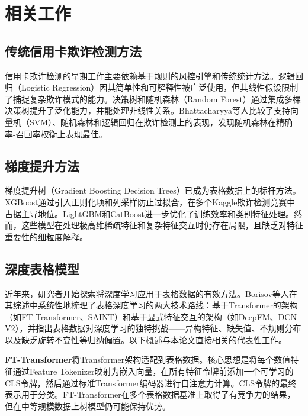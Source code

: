
\section{相关工作}

\subsection{传统信用卡欺诈检测方法}

信用卡欺诈检测的早期工作主要依赖基于规则的风控引擎和传统统计方法。逻辑回归（Logistic Regression）因其简单性和可解释性被广泛使用，但其线性假设限制了捕捉复杂欺诈模式的能力。决策树和随机森林（Random Forest）通过集成多棵决策树提升了泛化能力，并能处理非线性关系。Bhattacharyya等人\cite{bhattacharyya2011data}比较了支持向量机（SVM）、随机森林和逻辑回归在欺诈检测上的表现，发现随机森林在精确率-召回率权衡上表现最佳。

\subsection{梯度提升方法}

梯度提升树（Gradient Boosting Decision Trees）已成为表格数据上的标杆方法。XGBoost\cite{chen2016xgboost}通过引入正则化项和列采样防止过拟合，在多个Kaggle欺诈检测竞赛中占据主导地位。LightGBM和CatBoost进一步优化了训练效率和类别特征处理。然而，这些模型在处理极高维稀疏特征和复杂特征交互时仍存在局限，且缺乏对特征重要性的细粒度解释。

\subsection{深度表格模型}

近年来，研究者开始探索将深度学习应用于表格数据的有效方法。Borisov等人\cite{borisov2024deep}在其综述中系统性地梳理了表格深度学习的两大技术路线：基于Transformer的架构（如FT-Transformer、SAINT）和基于显式特征交互的架构（如DeepFM、DCN-V2），并指出表格数据对深度学习的独特挑战——异构特征、缺失值、不规则分布以及缺乏旋转不变性等归纳偏置。以下概述与本论文直接相关的代表性工作。

\textbf{FT-Transformer}\cite{gorishniy2021revisiting}将Transformer架构适配到表格数据。核心思想是将每个数值特征通过Feature Tokenizer映射为嵌入向量，在所有特征令牌前添加一个可学习的CLS令牌，然后通过标准Transformer编码器进行自注意力计算。CLS令牌的最终表示用于分类。FT-Transformer在多个表格数据基准上取得了有竞争力的结果，但在中等规模数据上树模型仍可能保持优势\cite{grinsztajn2022tree}。

